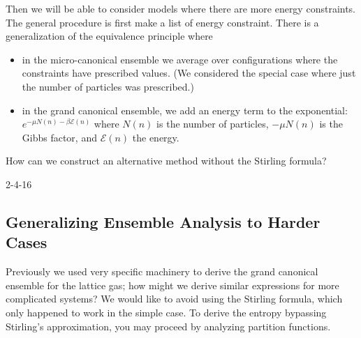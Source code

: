 \documentclass[12pt]{book}
\theoremstyle{norm}
\begin{document}
Then we will be able to consider models where there are more energy constraints. The general procedure is first make a list of energy constraint. There is a generalization of the equivalence principle where 
\begin{itemize}
\item
in the micro-canonical ensemble we average over configurations where the constraints have prescribed values. (We considered the special case where just the number of particles was prescribed.) %
\item 
in the grand canonical ensemble, we add an energy term to the exponential: $e^{-\mu N(n) - \beta\mathcal{E}(n)}$ where $N(n)$ is the number of particles, $-\mu N(n)$ is the Gibbs factor, and $\mathcal{E}(n)$ the energy.
\end{itemize}

How can we construct an alternative method without the Stirling formula?



{\color{blue}2-4-16}

\subsection{Generalizing Ensemble Analysis to Harder Cases}

Previously we used very specific machinery to derive the grand canonical ensemble for the lattice gas; how might we derive similar expressions for more complicated systems?  We would like to avoid using the Stirling formula, which only happened to work in the simple case. 
To derive the entropy bypassing Stirling's approximation, you may proceed by analyzing partition functions. 
\end{document}
